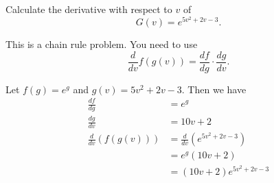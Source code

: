 \documentclass{ximera}
\author{Emma Smith Zbarsky}
\begin{document}
\begin{exercise}

Calculate the derivative with respect to $v$ of
\[G(v) = e^{5v^2+2v-3}.\]


\begin{hint}
This is a chain rule problem. You need to use
\[\frac{d}{dv}f(g(v)) = \frac{df}{dg}\cdot\frac{dg}{dv}.\]
\end{hint}


\begin{hint}
Let $f(g) = e^g$ and $g(v) = 5v^2+2v-3$. Then we have \begin{align*}
\frac{df}{dg} &= e^g \\
\frac{dg}{dv} &= 10v+2 \\
\frac{d}{dv}\left(f(g(v))\right) &= \frac{d}{dv}\left(e^{5v^2+2v-3}\right) \\
&= e^g(10v+2) \\ &= \boxed{(10v+2)e^{5v^2+2v-3}}
\end{align*}
\end{hint}


\begin{multipleChoice}
\end{multipleChoice}

\end{exercise}
\end{document}
